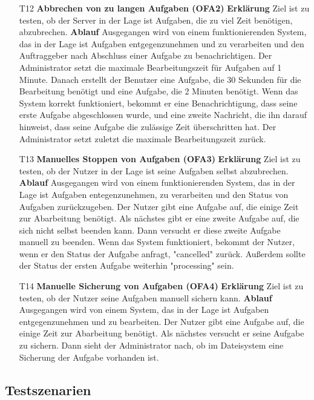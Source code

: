 \documentclass[a4paper,12pt]{article}
\begin{document}
\begin{itemize}

\item[T12] \textbf{Abbrechen von zu langen Aufgaben (OFA2)}
\subitem \textbf{Erklärung} Ziel ist zu testen, ob der Server in der Lage ist Aufgaben, die zu viel Zeit benötigen, abzubrechen.
\subitem \textbf{Ablauf} Ausgegangen wird von einem funktionierenden System, das in der Lage ist Aufgaben entgegenzunehmen und zu verarbeiten und den Auftraggeber nach Abschluss einer Aufgabe zu benachrichtigen.
Der Administrator setzt die maximale Bearbeitungszeit für Aufgaben auf 1 Minute.
Danach erstellt der Benutzer eine Aufgabe, die 30 Sekunden für die Bearbeitung benötigt und eine Aufgabe, die 2 Minuten benötigt.
Wenn das System korrekt funktioniert, bekommt er eine Benachrichtigung, dass seine erste Aufgabe abgeschlossen wurde,
und eine zweite Nachricht, die ihn darauf hinweist, dass seine Aufgabe die zulässige Zeit überschritten hat.
Der Administrator setzt zuletzt die maximale Bearbeitungszeit zurück.

\item[T13] \textbf{Manuelles Stoppen von Aufgaben (OFA3)}
\subitem \textbf{Erklärung} Ziel ist zu testen, ob der Nutzer in der Lage ist seine Aufgaben selbst abzubrechen.
\subitem \textbf{Ablauf} Ausgegangen wird von einem funktionierenden System, das in der Lage ist Aufgaben entegenzunehmen, zu verarbeiten und den Status von Aufgaben zurückzugeben.
Der Nutzer gibt eine Aufgabe auf, die einige Zeit zur Abarbeitung benötigt. Als nächstes gibt er eine zweite Aufgabe auf, die sich nicht selbst beenden kann.
Dann versucht er diese zweite Aufgabe manuell zu beenden. Wenn das System funktioniert, bekommt der Nutzer, wenn er den Status der Aufgabe anfragt, "cancelled" zurück.
Außerdem sollte der Status der ersten Aufgabe weiterhin "processing" sein.

\item[T14] \textbf{Manuelle Sicherung von Aufgaben (OFA4)}
\subitem \textbf{Erklärung} Ziel ist zu testen, ob der Nutzer seine Aufgaben manuell sichern kann.
\subitem \textbf{Ablauf} Ausgegangen wird von einem System, das in der Lage ist Aufgaben entgegenzunehmen und zu bearbeiten.
Der Nutzer gibt eine Aufgabe auf, die einige Zeit zur Abarbeitung benötigt.
Als nächstes versucht er seine Aufgabe zu sichern.
Dann sieht der Administrator nach, ob im Dateisystem eine Sicherung der Aufgabe vorhanden ist.

\end{itemize}

\subsection{Testszenarien}

\clearpage
\printnoidxglossaries
\end{document}
